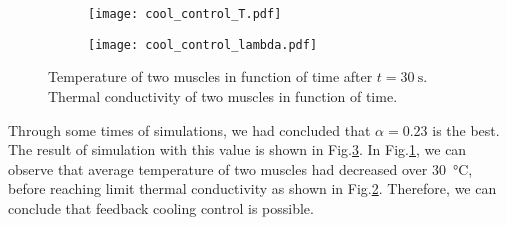 \begin{figure}[t]
	\centering
	\begin{subfigure}[t]{0.45\textwidth}
		\centering\texttt{[image: cool\_control\_T.pdf]}
		\caption{\label{cool_control_T}}
	\end{subfigure}%
	\begin{subfigure}[t]{0.45\textwidth}
		\centering\texttt{[image: cool\_control\_lambda.pdf]}
		\caption{\label{cool_control_lambda}}
	\end{subfigure}
	\caption[Sustainable Closed-Loop \APC Simulation]{ Temperature of two muscles in function of time after $t=\SI{30}{\second}$.  Thermal conductivity of two muscles in function of time. }
	\label{cool_simulation}
\end{figure}

Through some times of simulations, we had concluded that $\alpha = 0.23$ is the best. The result of simulation with this value is shown in Fig.\ref{cool_simulation}. In Fig.\ref{cool_control_T}, we can observe that average temperature of two muscles had decreased over \SI{30}{\degreeCelsius}, before reaching limit thermal conductivity as shown in Fig.\ref{cool_control_lambda}. Therefore, we can conclude that feedback cooling control is possible.


